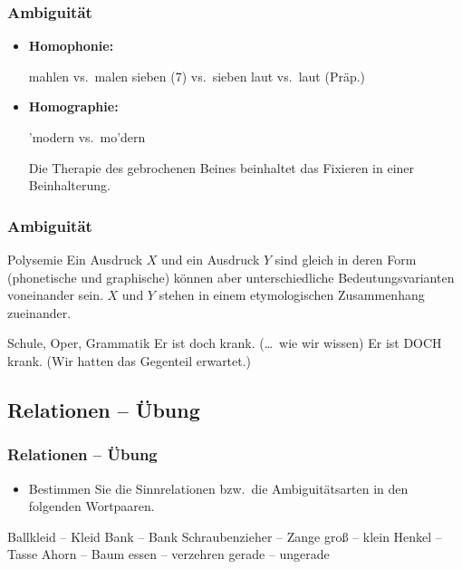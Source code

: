 \begin{frame}
\frametitle{Ambiguität}


\begin{itemize}
	\item \textbf{Homophonie:}
	
	\eal
	\ex mahlen vs.\ malen 
	\ex sieben (7) vs.\ sieben
	\ex laut vs.\ laut (Präp.)
	\zl
	
	\item \textbf{Homographie:}
			
	\eal 
	\ex 'modern vs.\ mo'dern

\pause 
	
	\ex Die Therapie des gebrochenen Beines beinhaltet das Fixieren in einer Beinhalterung.
	\zl
	
\end{itemize}
	
\end{frame}


\begin{frame}
\frametitle{Ambiguität}

\begin{block}{Polysemie}
Ein Ausdruck $X$ und ein Ausdruck $Y$ sind gleich in deren Form (phonetische und graphische) können aber unterschiedliche Bedeutungsvarianten voneinander sein. $X$ und $Y$ stehen in einem etymologischen Zusammenhang zueinander.
\end{block}

\ea Schule, Oper, Grammatik
\ex 
	\ea Er ist doch krank. \hfill (\dots\ wie wir wissen)
	\ex Er ist DOCH krank. \hfill (Wir hatten das Gegenteil erwartet.)
	\z 
\z

\nocite{Enders17a}

\end{frame}


%
\subsection{Relationen -- Übung}
%

\begin{frame}
\frametitle{Relationen -- Übung}

\begin{itemize}
	\item Bestimmen Sie die Sinnrelationen bzw.\ die Ambiguitätsarten in den folgenden Wortpaaren.
\end{itemize}
	
\eal
	\ex\label{ex:Rel1} Ballkleid -- Kleid
	\ex\label{ex:Rel2} Bank -- Bank
	\ex\label{ex:Rel3} Schraubenzieher -- Zange
	\ex\label{ex:Rel4} gro\ss{} -- klein
	\ex\label{ex:Rel5} Henkel -- Tasse
	\ex\label{ex:Rel6} Ahorn -- Baum
	\ex\label{ex:Rel7} essen -- verzehren
	\ex\label{ex:Rel8} gerade -- ungerade
\zl

\end{frame}


